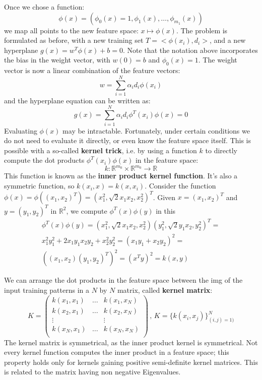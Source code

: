 Once we chose a function:
\begin{equation*}
    \phi(x) = (\phi_0(x) = 1, \phi_1(x), \dots , \phi_{m_1}(x))
\end{equation*}
we map all points to the new feature space: $x \mapsto \phi(x)$. The problem is formulated as before, with a new training set $T = < \phi(x_i),d_i >$, and a new hyperplane $g(x) = w^T \phi(x) + b = 0$. Note that the notation above incorporates the bias in the weight vector, with $w(0) = b$ and $\phi_0(x) = 1$. The weight vector is now a linear combination of the feature vectors:
\begin{equation*}
    w = \sum_{i=1}^N \alpha_i d_i \phi(x_i)
\end{equation*}
and the hyperplane equation can be written as:
\begin{equation*}
    g(x) = \sum_{i=1}^N \alpha_i d_i \phi^T (x_i) \phi(x) = 0
\end{equation*}
Evaluating $\phi(x)$ may be intractable. Fortunately, under certain conditions we do not need to evaluate it directly, or even know the feature space itself. This is possible with a so-called \textbf{kernel trick}, i.e. by using a function $k$ to directly compute the dot products $\phi^T (x_i) \phi(x)$ in the feature space:
\begin{equation*}
    k : \mathbb{R}^{m_0} \times \mathbb{R}^{m_0} \xrightarrow{} \mathbb{R}
\end{equation*}
This function is known as the \textbf{inner product kernel function}. It's also a symmetric function, so $k(x_i, x) = k(x, x_i)$. Consider the function $\phi(x) = \phi((x_1, x_2)^T) = (x_1^2, \sqrt{2}x_1x_2, x_2^2)^T$. Given $x = (x_1, x_2)^T$ and $y=(y_1,y_2)^T$ in $\mathbb{R}^2$, we compute $\phi^T(x)\phi(y)$ in this 
\begin{gather*}
    \phi^T(x)\phi(y) = (x_1^2, \sqrt{2}x_1x_2, x_2^2) (y_1^2, \sqrt{2}y_1x_2, y_2^2)^T = \\
    x_1^2y_1^2 + 2x_1y_1x_2y_2 + x_2^2y_2^2 = (x_1y_1 + x_2y_2)^2 = \\
    ((x_1,x_2)(y_1,y_2)^T)^2 = (x^Ty)^2 = k(x,y)
\end{gather*}

We can arrange the dot products in the feature space between the img of the input training patterns in a $N$ by $N$ matrix, called \textbf{kernel matrix}:
\begin{equation*}
    K = \begin{pmatrix}
        k(x_1,x_1) & \dots & k(x_1, x_N) \\
        k(x_2,x_1) & \dots & k(x_2, x_N) \\
        \vdots & & \vdots \\
        k(x_N,x_1) & \dots & k(x_N, x_N) \\
        \end{pmatrix} \,, \,
        K = \{k(x_i, x_j)\}_{(i,j)=1)}^N
\end{equation*}
The kernel matrix is symmetrical, as the inner product kernel is symmetrical. Not every kernel function computes the inner product in a feature space; this property holds only for kernels gaining positive semi-definite kernel matrices. This is related to the matrix having non negative Eigenvalues.

